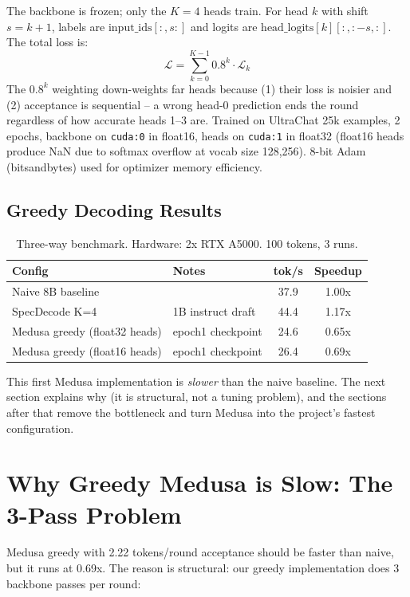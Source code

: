 \documentclass[12pt, a4paper]{article}
\begin{document}
The backbone is frozen; only the $K = 4$ heads train. For head $k$ with shift
$s = k + 1$, labels are $\text{input\_ids}[:, s:]$ and logits are
$\text{head\_logits}[k][:, :-s, :]$. The total loss is:
\[
    \mathcal{L} = \sum_{k=0}^{K-1} 0.8^k \cdot \mathcal{L}_k
\]
The $0.8^k$ weighting down-weights far heads because (1) their loss is noisier and
(2) acceptance is sequential -- a wrong head-0 prediction ends the round regardless
of how accurate heads 1--3 are. Trained on UltraChat 25k examples, 2 epochs,
backbone on \texttt{cuda:0} in float16, heads on \texttt{cuda:1} in float32
(float16 heads produce NaN due to softmax overflow at vocab size 128,256).
8-bit Adam (bitsandbytes) used for optimizer memory efficiency.

\subsection{Greedy Decoding Results}

\begin{table}[H]
\centering
\caption{Three-way benchmark. Hardware: 2x RTX A5000. 100 tokens, 3 runs.}
\begin{tabular}{@{}llcc@{}}
\toprule
Config & Notes & tok/s & Speedup \\
\midrule
Naive 8B baseline & & 37.9 & 1.00x \\
SpecDecode K=4 & 1B instruct draft & 44.4 & 1.17x \\
Medusa greedy (float32 heads) & epoch1 checkpoint & 24.6 & 0.65x \\
Medusa greedy (float16 heads) & epoch1 checkpoint & 26.4 & 0.69x \\
\bottomrule
\end{tabular}
\end{table}

This first Medusa implementation is \emph{slower} than the naive baseline. The next
section explains why (it is structural, not a tuning problem), and the sections after
that remove the bottleneck and turn Medusa into the project's fastest configuration.

\section{Why Greedy Medusa is Slow: The 3-Pass Problem}

Medusa greedy with 2.22 tokens/round acceptance should be faster than naive, but
it runs at 0.69x. The reason is structural: our greedy implementation does 3
backbone passes per round:
\end{document}
